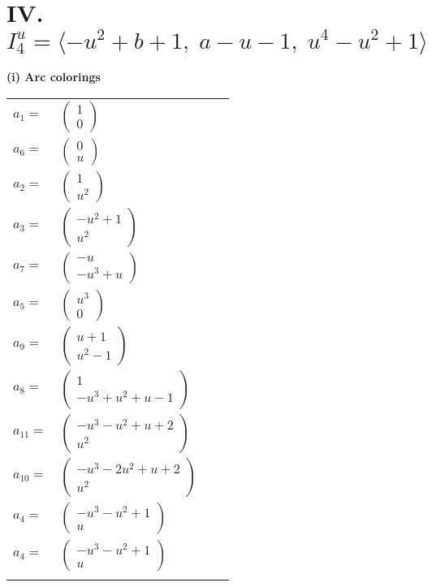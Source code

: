 \documentclass[1p]{elsarticle_modified}
\theoremstyle{definition}
\begin{document}
\centering \section*{IV. $I^u_{4}= \langle - u^2+b+1,\;a- u-1,\;u^4- u^2+1 \rangle$}
\flushleft \textbf{(i) Arc colorings}\\
\begin{tabular}{m{7pt} m{180pt} m{7pt} m{180pt} }
\flushright $a_{1}=$&$\begin{pmatrix}1\\0\end{pmatrix}$ \\
\flushright $a_{6}=$&$\begin{pmatrix}0\\u\end{pmatrix}$ \\
\flushright $a_{2}=$&$\begin{pmatrix}1\\u^2\end{pmatrix}$ \\
\flushright $a_{3}=$&$\begin{pmatrix}- u^2+1\\u^2\end{pmatrix}$ \\
\flushright $a_{7}=$&$\begin{pmatrix}- u\\- u^3+u\end{pmatrix}$ \\
\flushright $a_{5}=$&$\begin{pmatrix}u^3\\0\end{pmatrix}$ \\
\flushright $a_{9}=$&$\begin{pmatrix}u+1\\u^2-1\end{pmatrix}$ \\
\flushright $a_{8}=$&$\begin{pmatrix}1\\- u^3+u^2+u-1\end{pmatrix}$ \\
\flushright $a_{11}=$&$\begin{pmatrix}- u^3- u^2+u+2\\u^2\end{pmatrix}$ \\
\flushright $a_{10}=$&$\begin{pmatrix}- u^3-2 u^2+u+2\\u^2\end{pmatrix}$ \\
\flushright $a_{4}=$&$\begin{pmatrix}- u^3- u^2+1\\u\end{pmatrix}$\\ \flushright $a_{4}=$&$\begin{pmatrix}- u^3- u^2+1\\u\end{pmatrix}$\\&\end{tabular}
\end{document}
